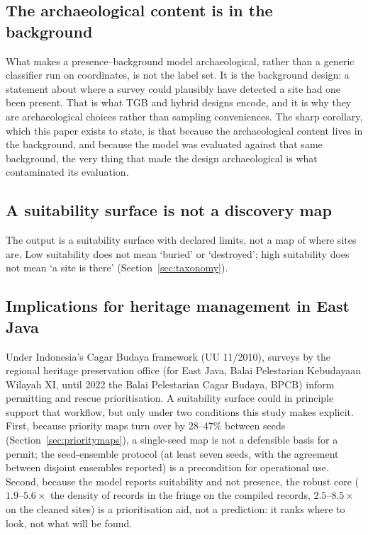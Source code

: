 \documentclass[12pt]{article}
\begin{document}
\subsection{The archaeological content is in the background}

What makes a presence--background model archaeological, rather than a generic classifier run on coordinates, is not the label set.
It is the background design: a statement about where a survey could plausibly have detected a site had one been present.
That is what TGB and hybrid designs encode, and it is why they are archaeological choices rather than sampling conveniences.
The sharp corollary, which this paper exists to state, is that because the archaeological content lives in the background, and because the model was evaluated against that same background, the very thing that made the design archaeological is what contaminated its evaluation.

\subsection{A suitability surface is not a discovery map}

The output is a suitability surface with declared limits, not a map of where sites are.
Low suitability does not mean `buried' or `destroyed'; high suitability does not mean `a site is there' (Section~\ref{sec:taxonomy}).

\subsection{Implications for heritage management in East Java}

Under Indonesia's Cagar Budaya framework (UU 11/2010), surveys by the regional heritage preservation office (for East Java, Balai Pelestarian Kebudayaan Wilayah XI, until 2022 the Balai Pelestarian Cagar Budaya, BPCB) inform permitting and rescue prioritisation.
A suitability surface could in principle support that workflow, but only under two conditions this study makes explicit.
First, because priority maps turn over by $28$--$47\%$ between seeds (Section~\ref{sec:prioritymaps}), a single-seed map is not a defensible basis for a permit; the seed-ensemble protocol (at least seven seeds, with the agreement between disjoint ensembles reported) is a precondition for operational use.
Second, because the model reports suitability and not presence, the robust core ($1.9$--$5.6\times$ the density of records in the fringe on the compiled records, $2.5$--$8.5\times$ on the cleaned sites) is a prioritisation aid, not a prediction: it ranks where to look, not what will be found.
\end{document}
